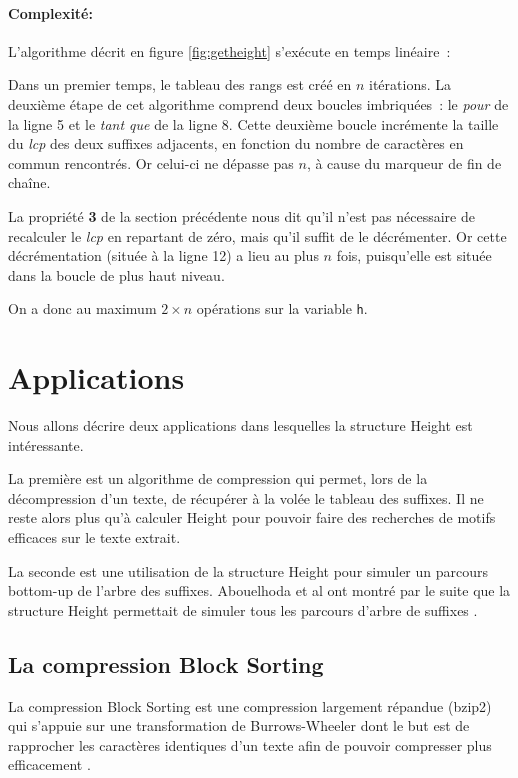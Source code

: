 \documentclass[a4paper,11pt]{article}
\begin{document}
\paragraph{Complexité:\\}{L'algorithme décrit en figure
  \ref{fig:getheight} s'exécute en temps linéaire~:}

Dans un premier temps, le tableau des rangs est créé en $n$
itérations. La deuxième étape de cet algorithme comprend deux boucles
imbriquées~: le \textit{pour} de la ligne 5 et le \textit{tant que} de
la ligne 8. Cette deuxième boucle incrémente la taille du \textit{lcp}
des deux suffixes adjacents, en fonction du nombre de caractères en
commun rencontrés. Or celui-ci ne dépasse pas $n$, à cause du marqueur
de fin de chaîne.

La propriété \textbf{3} de la section précédente nous dit qu'il n'est
pas nécessaire de recalculer le \textit{lcp} en repartant de zéro,
mais qu'il suffit de le décrémenter. Or cette décrémentation (située à
la ligne 12) a lieu au plus $n$ fois, puisqu'elle est située dans la
boucle de plus haut niveau.

On a donc au maximum $2 \times n$ opérations sur la variable \texttt{h}.


\section{Applications}
\label{sec:appli}

Nous allons décrire deux applications dans lesquelles la structure
Height est intéressante. 

La première est un algorithme de compression
qui permet, lors de la décompression d'un texte, de récupérer à la
volée le tableau des suffixes. Il ne reste alors plus qu'à calculer
Height pour pouvoir faire des recherches de motifs efficaces sur le
texte extrait.

La seconde est une utilisation de la structure Height pour simuler un
parcours bottom-up de l'arbre des suffixes. Abouelhoda et al ont
montré par le suite que la structure Height permettait de simuler tous
les parcours d'arbre de suffixes \cite{Abouelhoda200453}.

\subsection{La compression Block Sorting}
\label{sec:blocksorting}

La compression Block Sorting est une compression largement répandue
(bzip2) qui s'appuie sur une transformation de Burrows-Wheeler
dont le but est de rapprocher les caractères identiques d'un texte
afin de pouvoir compresser plus efficacement \cite{Burrows94}.
\end{document}
